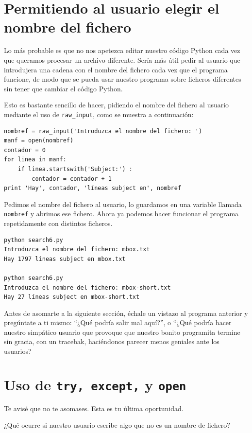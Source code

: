 \section{Permitiendo al usuario elegir el nombre del fichero}

Lo más probable es que no nos apetezca editar nuestro código Python
cada vez que queramos procesar un archivo diferente. Sería
más útil pedir al usuario que introdujera una cadena con el nombre del fichero
cada vez que el programa funcione, de modo que se pueda usar nuestro
programa sobre ficheros diferentes sin tener que cambiar el código Python.

Esto es bastante sencillo de hacer, pidiendo el nombre del fichero al
usuario mediante el uso de \verb"raw_input", como se muestra a continuación:

\beforeverb
\begin{verbatim}
nombref = raw_input('Introduzca el nombre del fichero: ')
manf = open(nombref)
contador = 0
for linea in manf:
    if linea.startswith('Subject:') :
        contador = contador + 1
print 'Hay', contador, 'líneas subject en', nombref
\end{verbatim}
\afterverb
%
Pedimos el nombre del fichero al usuario, lo guardamos en una variable
llamada {\tt nombref} y abrimos ese fichero. Ahora ya podemos hacer funcionar
el programa repetidamente con distintos ficheros.

\beforeverb
\begin{verbatim}
python search6.py 
Introduzca el nombre del fichero: mbox.txt
Hay 1797 líneas subject en mbox.txt

python search6.py 
Introduzca el nombre del fichero: mbox-short.txt
Hay 27 líneas subject en mbox-short.txt
\end{verbatim}
\afterverb
%
Antes de asomarte a la siguiente sección, échale un vistazo al programa anterior
y pregúntate a ti mismo: ``¿Qué podría salir mal aquí?'', o ``¿Qué podría hacer
nuestro simpático usuario que provoque que nuestro bonito programita
termine sin gracia, con un tracebak, haciéndonos parecer menos geniales
ante los usuarios?

\section{Uso de {\tt try, except,} y {\tt open}}

Te avisé que no te asomases. Esta es tu última oportunidad.

¿Qué ocurre si nuestro usuario escribe algo que no es un nombre de fichero?

